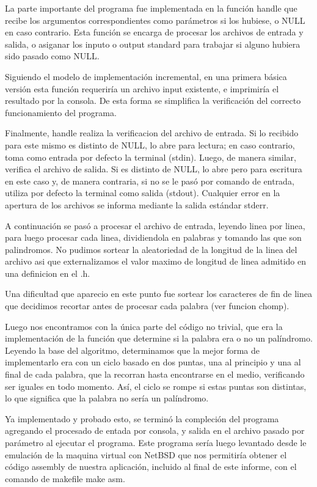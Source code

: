 \documentclass[10pt,a4paper]{article}
\begin{document}
La parte importante del programa fue implementada en la función handle que recibe los argumentos correspondientes como parámetros si los hubiese, o NULL en caso contrario. Esta función se encarga de procesar los archivos de entrada y salida, o asiganar los inputo o output standard para trabajar si alguno hubiera sido pasado como NULL.

Siguiendo el modelo de implementación incremental, en una primera básica versión esta función requeriría un archivo input existente, e imprimiría el resultado por la consola. De esta forma se simplifica la verificación del correcto funcionamiento del programa.

Finalmente, handle realiza la verificacion del archivo de entrada. Si lo recibido para este mismo es distinto de NULL, lo abre para lectura; en caso contrario, toma como entrada por defecto la terminal (stdin). Luego, de manera similar, verifica el archivo de salida. Si es distinto de NULL, lo abre pero para escritura en este caso y, de manera contraria, si no se le pasó por comando de entrada, utiliza por defecto la terminal como salida (stdout). Cualquier error en la apertura de los archivos se informa mediante la salida estándar stderr.

A continuación se pasó a procesar el archivo de entrada, leyendo linea por linea, para luego procesar cada linea, dividiendola en palabras y tomando las que son palindromos. No pudimos sortear la aleatoriedad de la longitud de la linea del archivo asi que externalizamos el valor maximo de longitud de linea admitido en una definicion en el .h.

Una dificultad que aparecio en este punto fue sortear los caracteres de fin de linea que decidimos recortar antes de procesar cada palabra (ver funcion chomp).

Luego nos encontramos con la única parte del código no trivial, que era la implementación de la función que determine si la palabra era o no un palíndromo. Leyendo la base del algoritmo, determinamos que la mejor forma de implementarlo era con un ciclo basado en dos puntas, una al principio y una al final de cada palabra, que la recorran hasta encontrarse en el medio, verificando ser iguales en todo momento. Así, el ciclo se rompe si estas puntas son distintas, lo que significa que la palabra no sería un palíndromo.

Ya implementado y probado esto, se terminó la compleción del programa agregando el procesado de entada por consola, y salida en el archivo pasado por parámetro al ejecutar el programa. Este programa sería luego levantado desde le emulación de la maquina virtual con NetBSD que nos permitiría obtener el código assembly de nuestra aplicación, incluido al final de este informe, con el comando de makefile make asm.
\end{document}
